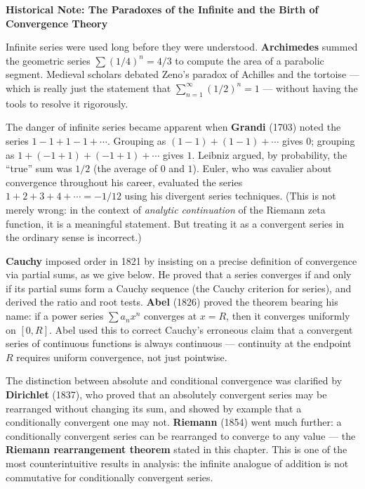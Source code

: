\documentclass[12pt, openany]{book}
\theoremstyle{plain}
\theoremstyle{definition}
\theoremstyle{remark}
\begin{document}
\begin{remarkbox}
\textbf{Historical Note: The Paradoxes of the Infinite and the Birth of Convergence Theory}

Infinite series were used long before they were understood. \textbf{Archimedes} summed the geometric series $\sum (1/4)^n = 4/3$ to compute the area of a parabolic segment. Medieval scholars debated Zeno's paradox of Achilles and the tortoise --- which is really just the statement that $\sum_{n=1}^\infty (1/2)^n = 1$ --- without having the tools to resolve it rigorously.

The danger of infinite series became apparent when \textbf{Grandi} (1703) noted the series $1 - 1 + 1 - 1 + \cdots$. Grouping as $(1-1) + (1-1) + \cdots$ gives $0$; grouping as $1 + (-1+1) + (-1+1) + \cdots$ gives $1$. Leibniz argued, by probability, the ``true'' sum was $1/2$ (the average of $0$ and $1$). Euler, who was cavalier about convergence throughout his career, evaluated the series $1 + 2 + 3 + 4 + \cdots = -1/12$ using his divergent series techniques. (This is not merely wrong: in the context of \emph{analytic continuation} of the Riemann zeta function, it is a meaningful statement. But treating it as a convergent series in the ordinary sense is incorrect.)

\textbf{Cauchy} imposed order in 1821 by insisting on a precise definition of convergence via partial sums, as we give below. He proved that a series converges if and only if its partial sums form a Cauchy sequence (the Cauchy criterion for series), and derived the ratio and root tests. \textbf{Abel} (1826) proved the theorem bearing his name: if a power series $\sum a_n x^n$ converges at $x = R$, then it converges uniformly on $[0, R]$. Abel used this to correct Cauchy's erroneous claim that a convergent series of continuous functions is always continuous --- continuity at the endpoint $R$ requires uniform convergence, not just pointwise.

The distinction between absolute and conditional convergence was clarified by \textbf{Dirichlet} (1837), who proved that an absolutely convergent series may be rearranged without changing its sum, and showed by example that a conditionally convergent one may not. \textbf{Riemann} (1854) went much further: a conditionally convergent series can be rearranged to converge to any value --- the \textbf{Riemann rearrangement theorem} stated in this chapter. This is one of the most counterintuitive results in analysis: the infinite analogue of addition is not commutative for conditionally convergent series.
\end{remarkbox}
\color{black}
\end{document}
